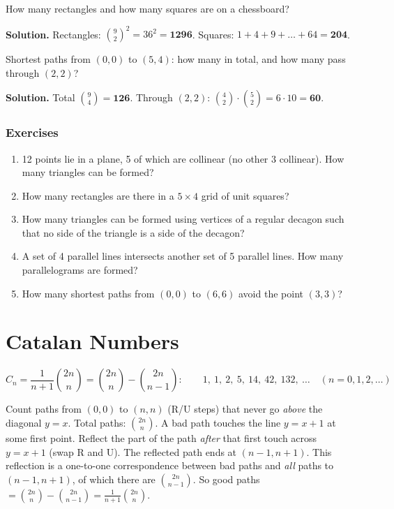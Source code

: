 \documentclass[11pt,a4paper,openany]{report}
\newenvironment{exercises}{\subsection*{Exercises \thechapter}\begin{enumerate}[label=\textbf{\thechapter.\arabic*},leftmargin=3.2em]}{\end{enumerate}}
\newcommand{\C}[2]{\binom{#1}{#2}}
\begin{document}
\begin{example}
How many rectangles and how many squares are on a chessboard?

\textbf{Solution.} Rectangles: $\C92^2=36^2=\mathbf{1296}$. Squares: $1+4+9+\dots+64=\mathbf{204}$.
\end{example}

\begin{example}
Shortest paths from $(0,0)$ to $(5,4)$: how many in total, and how many pass through $(2,2)$?

\textbf{Solution.} Total $\C94=\mathbf{126}$. Through $(2,2)$: $\C42\cdot\C{5}{2}=6\cdot10=\mathbf{60}$.
\end{example}

\begin{exercises}
\item 12 points lie in a plane, 5 of which are collinear (no other 3 collinear). How many triangles can be formed?
\item How many rectangles are there in a $5\times4$ grid of unit squares?
\item How many triangles can be formed using vertices of a regular decagon such that no side of the triangle is a side of the decagon?
\item A set of 4 parallel lines intersects another set of 5 parallel lines. How many parallelograms are formed?
\item How many shortest paths from $(0,0)$ to $(6,6)$ avoid the point $(3,3)$?
\end{exercises}

\chapter{Catalan Numbers}\label{ch:cat}

\[C_n=\frac{1}{n+1}\C{2n}{n}=\C{2n}{n}-\C{2n}{n-1}:\qquad 1,\ 1,\ 2,\ 5,\ 14,\ 42,\ 132,\ \dots\quad (n=0,1,2,\dots)\]

\begin{why}
Count paths from $(0,0)$ to $(n,n)$ (R/U steps) that never go \emph{above} the diagonal $y=x$.
Total paths: $\C{2n}n$. A bad path touches the line $y=x+1$ at some first point. Reflect the part of the
path \emph{after} that first touch across $y=x+1$ (swap R and U). The reflected path ends at $(n-1,n+1)$.
This reflection is a one-to-one correspondence between bad paths and \emph{all} paths to $(n-1,n+1)$, of which
there are $\C{2n}{n-1}$. So good paths $=\C{2n}n-\C{2n}{n-1}=\frac1{n+1}\C{2n}n$.
\end{why}
\end{document}
